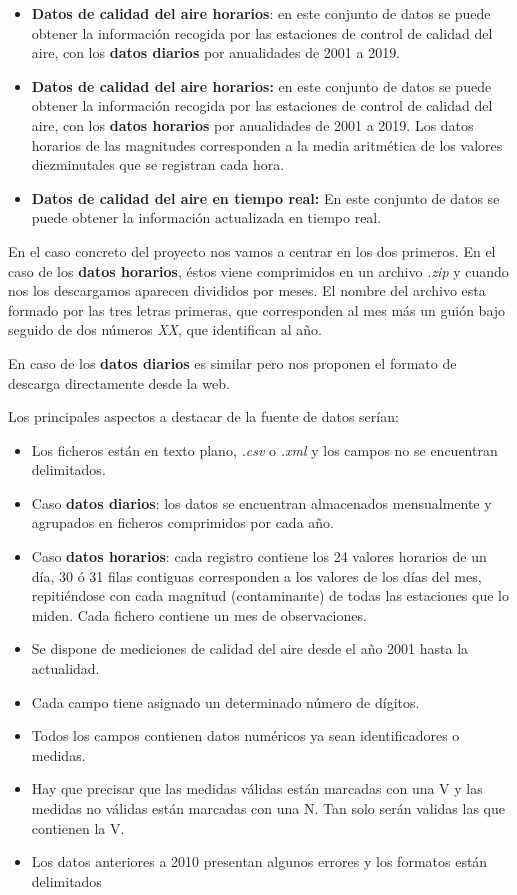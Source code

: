 \begin{itemize}
	\item \textbf{Datos de calidad del aire horarios}: en este conjunto de datos se puede obtener la información recogida por las estaciones de control de calidad del aire, con los \textbf{datos diarios} por anualidades de 2001 a 2019. 
	\item \textbf{Datos de calidad del aire horarios:} en este conjunto de datos se puede obtener la información recogida por las estaciones de control de calidad del aire, con los \textbf{datos horarios} por anualidades de 2001 a 2019. Los datos horarios de las magnitudes corresponden a la media aritmética de los valores diezminutales que se registran cada hora.
	\item \textbf{Datos de calidad del aire en tiempo real:} En este conjunto de datos se puede obtener la información actualizada en tiempo real.
\end{itemize}

En el caso concreto del proyecto nos vamos a centrar en los dos primeros. En el caso de los \textbf{datos horarios}, éstos viene comprimidos en un archivo \textit{.zip} y cuando nos los descargamos aparecen divididos por meses. El nombre del archivo esta formado por las tres letras primeras, que corresponden al mes más un guión bajo seguido de dos números \textit{XX}, que identifican al año.

En caso de los \textbf{datos diarios} es similar pero nos proponen el formato de descarga directamente desde la web.

Los principales aspectos a destacar de la fuente de datos serían: 
\begin{itemize}
	\item Los ficheros están en texto plano, \textit{.csv} o \textit{.xml} y los campos no se encuentran delimitados.
	\item Caso\textbf{ datos diarios}: los datos se encuentran almacenados mensualmente y agrupados en ficheros comprimidos por cada año.
	\item Caso\textbf{ datos horarios}: cada registro contiene los 24 valores horarios de un día, 30 ó 31 filas contiguas corresponden a los valores de los días del mes, repitiéndose con cada magnitud (contaminante) de todas las estaciones que lo miden. Cada fichero contiene un mes de observaciones.
	\item Se dispone de mediciones de calidad del aire desde el año 2001 hasta la actualidad. 
	\item Cada campo tiene asignado un determinado número de dígitos. 
	\item Todos los campos contienen datos numéricos ya sean identificadores o medidas.
	\item Hay que precisar que las medidas válidas están marcadas con una V y las medidas no válidas están marcadas con una N. Tan solo serán validas las que contienen la V.
	\item Los datos anteriores a 2010 presentan algunos errores y los formatos están delimitados
\end{itemize}

